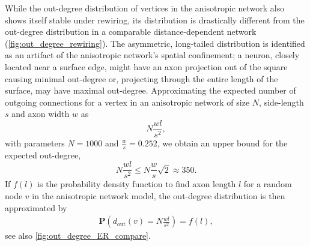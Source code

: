 While the out-degree distribution of vertices in the anisotropic
network also shows itself stable under rewiring, its distribution is
drastically different from the out-degree distribution in a comparable
distance-dependent network (\autoref{fig:out_degree_rewiring}). The
asymmetric, long-tailed distribution is identified as an artifact of
the anisotropic network's spatial confinement; a neuron, closely
located near a surface edge, might have an axon projection out of the
square causing minimal out-degree or, projecting through the entire
length of the surface, may have maximal out-degree. Approximating the
expected number of outgoing connections for a vertex in an anisotropic
network of size $N$, side-length $s$ and axon width $w$ as
\[
  N \frac{w l}{s^2},
\]
with parameters $N = 1000$ and $\frac{w}{s} = 0.252$, we obtain an
upper bound for the expected out-degree, 
\[
  N \frac{w l}{s^2} \leq N\frac{w}{s} \sqrt{2} \approx 350.
\]
If $f(l)$ is the probability density function to find axon length $l$
for a random node $v$ in the anisotropic network model, the out-degree
distribution is then approximated by
%
\begin{align}\label{eq:axon_length_approx}
  \mathbf{P}(d_{\mathrm{out}}(v) = N \frac{w l}{s^2}) = f(l),  
\end{align}
%
see also \autoref{fig:out_degree_ER_compare}.

